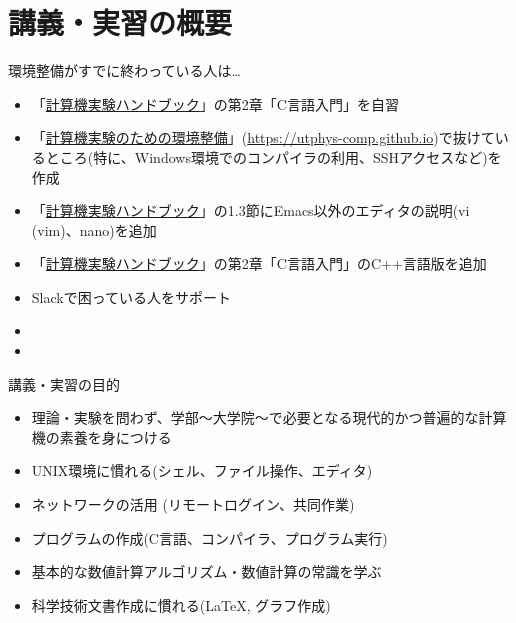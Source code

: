 \section{講義・実習の概要}

\begin{frame}[t]{環境整備がすでに終わっている人は…}
  \begin{itemize}
  \item 「\href{https://github.com/utphys-comp/handbook/releases/download/handbook-2019/handbook.pdf}{計算機実験ハンドブック}」の第2章「C言語入門」を自習
  \item 「\href{https://utphys-comp.github.io}{計算機実験のための環境整備}」({\small \href{https://utphys-comp.github.io}{https://utphys-comp.github.io}})で抜けているところ(特に、Windows環境でのコンパイラの利用、SSHアクセスなど)を作成
  \item 「\href{https://github.com/utphys-comp/handbook/releases/download/handbook-2019/handbook.pdf}{計算機実験ハンドブック}」の1.3節にEmacs以外のエディタの説明(vi (vim)、nano)を追加
  \item 「\href{https://github.com/utphys-comp/handbook/releases/download/handbook-2019/handbook.pdf}{計算機実験ハンドブック}」の第2章「C言語入門」のC++言語版を追加
  \item Slackで困っている人をサポート
  \item 
  \item 
  \end{itemize}
\end{frame}

\begin{frame}[t]{講義・実習の目的}
  \begin{itemize}
  \item 理論・実験を問わず、学部〜大学院〜で必要となる現代的かつ普遍的な計算機の素養を身につける
  \item UNIX環境に慣れる(シェル、ファイル操作、エディタ)
  \item ネットワークの活用 (リモートログイン、共同作業)
  \item プログラムの作成(C言語、コンパイラ、プログラム実行)
  \item 基本的な数値計算アルゴリズム・数値計算の常識を学ぶ
  \item 科学技術文書作成に慣れる(\LaTeX, グラフ作成)
  \end{itemize}
\end{frame}

